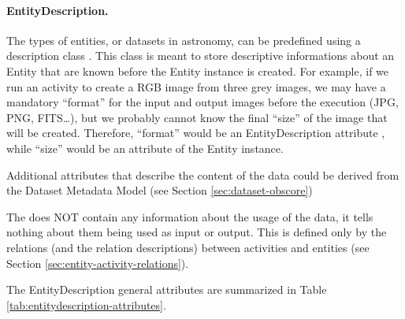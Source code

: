 \paragraph{EntityDescription.}
The types of entities, or datasets in astronomy, can be predefined using a description class .
This class is meant to store descriptive informations about an Entity that are known before the Entity instance is created. For example, if we run an activity to create a RGB image from three grey images, we may have a mandatory ``format'' for the input and output images before the execution (JPG, PNG, FITS\dots), but we probably cannot know the final ``size'' of the image  that will be created. Therefore, ``format'' would be an EntityDescription attribute , while ``size'' would be an attribute of the Entity instance. 

Additional attributes that describe the content of the data could be derived from 
the Dataset Metadata Model (see Section \ref{sec:dataset-obscore})

The  does NOT contain any information about the usage 
of the data, it tells nothing about them being used as input or output. This is 
defined only by the relations (and the relation descriptions) between activities
and entities (see Section \ref{sec:entity-activity-relations}).

The EntityDescription general attributes are summarized in Table 
\ref{tab:entitydescription-attributes}.



